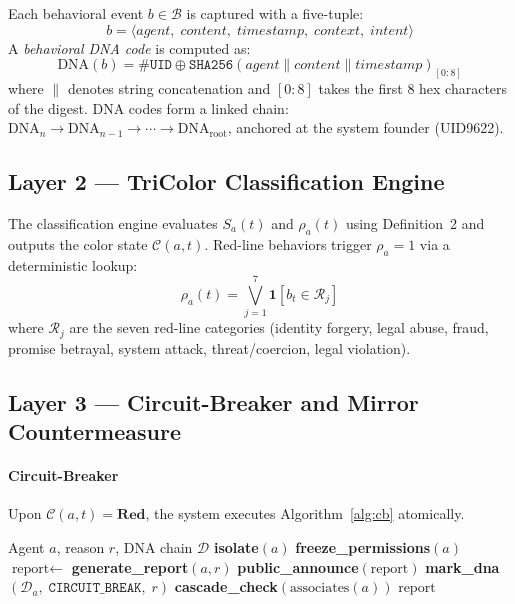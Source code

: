 \documentclass[conference]{IEEEtran}
\begin{document}
Each behavioral event $b \in \mathcal{B}$ is captured with a
five-tuple:
\begin{equation}
  b = \langle \textit{agent},\; \textit{content},\;
              \textit{timestamp},\; \textit{context},\;
              \textit{intent} \rangle
\end{equation}
A \emph{behavioral DNA code} is computed as:
\begin{equation}
  \text{DNA}(b) = \texttt{\#UID}\oplus
    \texttt{SHA256}(\textit{agent} \| \textit{content} \|
    \textit{timestamp})_{[0:8]}
  \label{eq:dna}
\end{equation}
where $\|$ denotes string concatenation and $[0:8]$ takes the first
8 hex characters of the digest.
DNA codes form a linked chain: $\text{DNA}_n \to \text{DNA}_{n-1}
\to \cdots \to \text{DNA}_{\text{root}}$, anchored at the system
founder (UID9622).

\subsection{Layer 2 — TriColor Classification Engine}

The classification engine evaluates $S_a(t)$ and $\rho_a(t)$ using
Definition~2 and outputs the color state $\mathcal{C}(a,t)$.
Red-line behaviors trigger $\rho_a = 1$ via a deterministic lookup:
\begin{equation}
  \rho_a(t) = \bigvee_{j=1}^{7} \mathbf{1}[b_t \in \mathcal{R}_j]
\end{equation}
where $\mathcal{R}_j$ are the seven red-line categories
(identity forgery, legal abuse, fraud, promise betrayal,
system attack, threat/coercion, legal violation).

\subsection{Layer 3 — Circuit-Breaker and Mirror Countermeasure}
\label{sec:cb}

\paragraph{Circuit-Breaker}
Upon $\mathcal{C}(a,t) = \textbf{Red}$, the system executes
Algorithm~\ref{alg:cb} atomically.

\begin{algorithm}[t]
\caption{Circuit-Breaker Execution}
\label{alg:cb}
\begin{algorithmic}[1]
\Require Agent $a$, reason $r$, DNA chain $\mathcal{D}$
\State \textbf{isolate}$(a)$ 
\State \textbf{freeze\_permissions}$(a)$
\State $\text{report} \gets$ \textbf{generate\_report}$(a, r)$
\State \textbf{public\_announce}$(\text{report})$
\State \textbf{mark\_dna}$(\mathcal{D}_a,\; \texttt{CIRCUIT\_BREAK},\; r)$
\State \textbf{cascade\_check}$(\text{associates}(a))$
\State \Return $\text{report}$
\end{algorithmic}
\end{algorithm}
\end{document}
